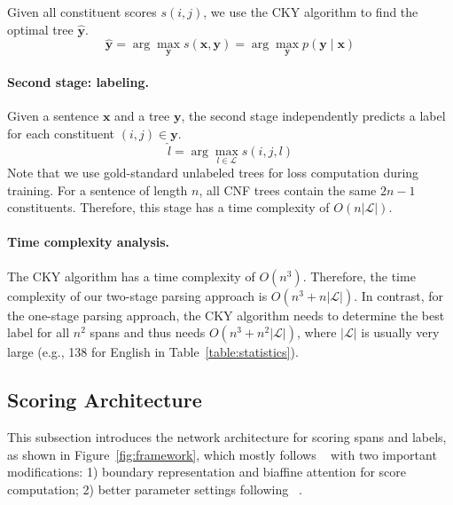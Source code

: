 \documentclass{article}
\begin{document}
Given all constituent scores $s(i,j)$, we use the CKY algorithm to find the optimal tree $\hat{\boldsymbol{y}}$.
\begin{equation} \label{equation:tree-argmax}
\hat{\boldsymbol{y}} = \arg\max_{\boldsymbol{y}} s(\boldsymbol{x}, \boldsymbol{y}) = \arg\max_{\boldsymbol{y}} p(\boldsymbol{y} \mid \boldsymbol{x})
\end{equation}






\paragraph{Second stage: labeling.}
Given a sentence $\boldsymbol{x}$ and a tree $\boldsymbol{y}$, the second stage independently predicts a label for each constituent $(i,j) \in \boldsymbol{y}$.
\begin{equation} \label{equation:label-argmax}
\hat{l} = \arg\max_{l \in \mathcal{L}} s(i,j,l)
\end{equation}
Note that we use gold-standard unlabeled trees for loss computation during training.
For a sentence of length $n$, all CNF trees contain the same $2n-1$ constituents. Therefore, this stage has a time complexity of $O(n|\mathcal{L}|)$.



\paragraph{Time complexity analysis.}
The CKY algorithm has a time complexity of $O(n^3)$. Therefore, the time complexity of our two-stage parsing approach is $O(n^3+n|\mathcal{L}|)$.
In contrast, for the one-stage parsing approach, the CKY algorithm needs to determine the best label for all $n^2$ spans and thus needs
$O(n^3+n^2|\mathcal{L}|)$, where $|\mathcal{L}|$ is usually very large (e.g., 138 for English in Table~\ref{table:statistics}).





\subsection{Scoring Architecture}

This subsection introduces the network architecture for scoring spans and labels, as shown in Figure~\ref{fig:framework}, which
mostly follows \citeauthor{stern-etal-2017-minimal}~ with two important modifications: 1) boundary representation and biaffine attention for score computation; 2) better parameter settings following \citeauthor{Timothy-d17-biaffine}~.
\end{document}
